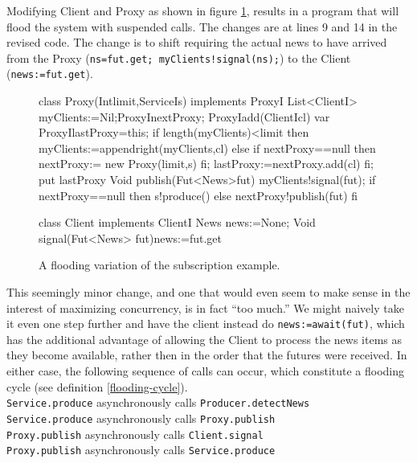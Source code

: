 \documentclass[12pt]{article}%
\begin{document}
Modifying Client and Proxy as shown in figure \ref{example-subscr-flooding}, results in a program that will flood the system with suspended calls. 
The changes are at lines 9 and 14 in the revised code.
The change is to shift requiring the actual news to have arrived from the Proxy (\lstinline{ns=fut.get; myClients!signal(ns);})
to the Client (\lstinline{news:=fut.get}).


\begin{figure}
\begin{abs}
class Proxy(Intlimit,ServiceIs) implements ProxyI{
  List<ClientI> myClients:=Nil;ProxyInextProxy;
  ProxyIadd(ClientIcl){
    var ProxyIlastProxy=this;
    if length(myClients)<limit then myClients:=appendright(myClients,cl)
    else if nextProxy==null then nextProxy:= new Proxy(limit,s) fi;
    lastProxy:=nextProxy.add(cl) fi; put lastProxy}
  Void publish(Fut<News>fut){
    myClients!signal(fut);
    if nextProxy==null then s!produce() else nextProxy!publish(fut) fi}}

class Client implements ClientI{
  News news:=None;
  Void signal(Fut<News> fut){news:=fut.get}}

\end{abs}
\caption{\label{example-subscr-flooding}
A flooding variation of the subscription example.}
\end{figure}

This seemingly minor change, and one that would even seem to make sense in the interest of maximizing concurrency, is in
fact ``too much.'' We might naively take it even one step further and have the client instead do 
\lstinline{news:=await(fut)}, 
which has the additional advantage of allowing the Client to process the news items as they become available, rather then in
the order that the futures were received. In either case, the following sequence of calls can occur, which constitute a
flooding cycle (see definition \ref{flooding-cycle}).
\\

{\small
\samepage
\indent\lstinline{Service.produce} asynchronously calls \lstinline{Producer.detectNews}
\\
\indent\lstinline{Service.produce} asynchronously calls \lstinline{Proxy.publish}
\\
\indent\lstinline{Proxy.publish} asynchronously calls \lstinline{Client.signal}
\\
\indent\lstinline{Proxy.publish} asynchronously calls \lstinline{Service.produce}
}\\
\end{document}
